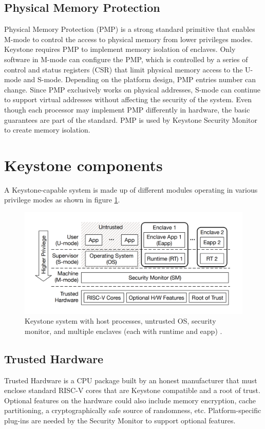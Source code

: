 \subsection{Physical Memory Protection}
Physical Memory Protection (PMP) is a strong standard primitive that enables M-mode to control the access to physical memory from lower privileges modes. Keystone requires PMP to implement memory isolation of enclaves.
Only software in M-mode can configure the PMP, which is controlled by a series of control and status registers (CSR) that limit physical memory access to the U-mode and S-mode. Depending on the platform design, PMP entries number can change. 
Since PMP exclusively works on physical addresses, S-mode can continue to support virtual addresses without affecting the security of the system. Even though each processor may implement PMP differently in hardware, the basic guarantees are part of the standard. PMP is used by Keystone Security Monitor to create memory isolation.

\section{Keystone components}
\label{keystone-components}
A Keystone-capable system is made up of different modules operating in various privilege modes as shown in figure \ref{keystoneComponents}.

\begin{figure}[h!]
    \centering
    \includegraphics[scale=0.35]{./chapters/images/keystone-components.png}
    \caption{Keystone system with host processes, untrusted OS, security monitor, and multiple enclaves (each with runtime and eapp) \cite{lee2020keystone}.}
    \label{keystoneComponents}
\end{figure}
\subsection*{Trusted Hardware}
Trusted Hardware is a CPU package built by an honest manufacturer that must enclose standard RISC-V cores that are Keystone compatible and a root of trust. Optional features on the hardware could also include memory encryption, cache partitioning, a cryptographically safe source of randomness, etc. Platform-specific plug-ins are needed by the Security Monitor to support optional features.
